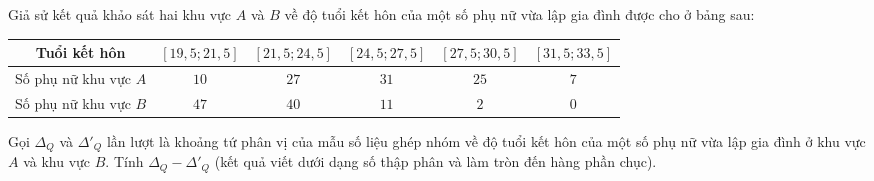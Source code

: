 \begin{bt}%

	Giả sử kết quả khảo sát hai khu vực $A$ và $B$ về độ tuổi kết hôn của một số phụ nữ vừa lập gia đình được cho ở bảng sau:
	\begin{center}
		\begin{tabular}{|c|c|c|c|c|c|}
			\hline
			Tuổi kết hôn&	$[19{,}5;21{,}5]$&	$[21{,}5;24{,}5]$&	$[24{,}5;27{,}5]$&	$[27{,}5;30{,}5]$&	$[31{,}5;33{,}5]$\\
			\hline
			Số phụ nữ khu vực $A$&	$10$&	$27$&	$31$&	$25$&	$7$\\
			\hline
			Số phụ nữ khu vực $B$&	$47$&	$40$&	$11$&	$2$&	$0$\\
			\hline
		\end{tabular}
	\end{center}
	Gọi $\Delta_Q$ và $\Delta'_Q$ lần lượt là khoảng tứ phân vị của mẫu số liệu ghép nhóm về độ tuổi kết hôn của một số phụ nữ vừa lập gia đình ở khu vực $A$ và khu vực $B$. Tính $\Delta_Q-\Delta'_Q$ (kết quả viết dưới dạng số thập phân và làm tròn đến hàng phần chục).
	

\end{bt}
